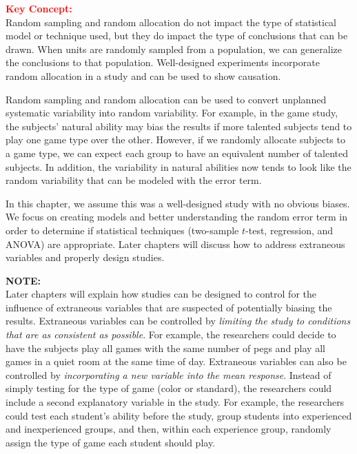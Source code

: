 \documentclass[
]{report}
\begin{document}
\textbf{\textcolor{red}{Key Concept:}}\\
\color{red}
Random sampling and random allocation do not impact the type of statistical model or technique used, but they do impact the type of conclusions that can be drawn. When units are randomly sampled from a population, we can generalize the conclusions to that population. Well-designed experiments incorporate random allocation in a study and can be used to show causation.
\color{black}
\normalsize

Random sampling and random allocation can be used to convert unplanned systematic variability into random variability. For example, in the game study, the subjects' natural ability may bias the results if more talented subjects tend to play one game type over the other. However, if we randomly allocate subjects to a game type, we can expect each group to have an equivalent number of talented subjects. In addition, the variability in natural abilities now tends to look like the random variability that can be modeled with the error term.

In this chapter, we assume this was a well-designed study with no obvious biases. We focus on creating models and better understanding the random error term in order to determine if statistical techniques (two-sample \(t\)-test, regression, and ANOVA) are appropriate. Later chapters will discuss how to address extraneous variables and properly design studies.

\large

\textbf{NOTE:}\\
Later chapters will explain how studies can be designed to control for the influence of extraneous variables that are suspected of potentially biasing the results. Extraneous variables can be controlled by \emph{limiting the study to conditions that are as consistent as possible}. For example, the researchers could decide to have the subjects play all games with the same number of pegs and play all games in a quiet room at the same time of day. Extraneous variables can also be controlled by \emph{incorporating a new variable into the mean response}. Instead of simply testing for the type of game (color or standard), the researchers could include a second explanatory variable in the study. For example, the researchers could test each student's ability before the study, group students into experienced and inexperienced groups, and then, within each experience group, randomly assign the type of game each student should play.
\normalsize
\end{document}
